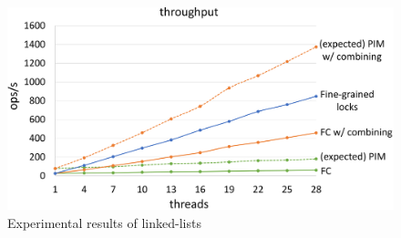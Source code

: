 \begin{figure}[ht!]
    \centering
    \includegraphics[width=1.0\linewidth]{linkedlist_data.eps} %
    \caption{Experimental results of linked-lists}
   \label{figure:linkedlist_data}
\end{figure}


